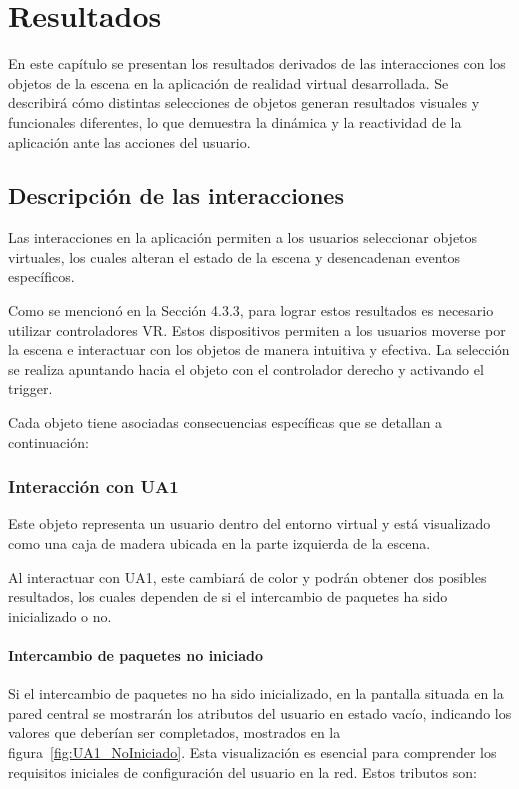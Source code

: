 \documentclass[a4paper, 12pt]{book}
\begin{document}

\cleardoublepage
\chapter{Resultados}
\label{chap:resultados}

En este capítulo se presentan los resultados derivados de las interacciones con los objetos de la escena en la aplicación 
de realidad virtual desarrollada. Se describirá cómo distintas selecciones de objetos generan resultados visuales y 
funcionales diferentes, lo que demuestra la dinámica y la reactividad de la aplicación ante las acciones del usuario.

\section{Descripción de las interacciones}
\label{sec:descripcion_interacciones}
Las interacciones en la aplicación permiten a los usuarios seleccionar objetos virtuales, 
los cuales alteran el estado de la escena y desencadenan eventos específicos. 

Como se mencionó en la Sección 4.3.3, para lograr estos resultados es necesario utilizar controladores VR. 
Estos dispositivos permiten a los usuarios moverse por la escena e interactuar con los objetos de manera intuitiva y efectiva.
La selección se realiza apuntando hacia el objeto con el controlador derecho y activando el trigger.

Cada objeto tiene asociadas consecuencias específicas que se detallan a continuación:

\subsection{Interacción con UA1}
\label{subsec:objeto_ua1}

Este objeto representa un usuario dentro del entorno virtual y está visualizado como una caja 
de madera ubicada en la parte izquierda de la escena.

Al interactuar con UA1, este cambiará de color y podrán obtener dos posibles resultados, los cuales dependen 
de si el intercambio de paquetes ha sido inicializado o no.

\subsubsection{Intercambio de paquetes no iniciado}
\label{subsubsec:Intercambio_NoIniciado}
Si el intercambio de paquetes no ha sido inicializado, en la pantalla situada en la pared central se mostrarán 
los atributos del usuario en estado vacío, indicando los valores que deberían ser completados, mostrados en la figura~\ref{fig:UA1_NoIniciado}. 
Esta visualización es esencial para comprender los requisitos iniciales de configuración del usuario en la red. Estos tributos son:
\end{document}
